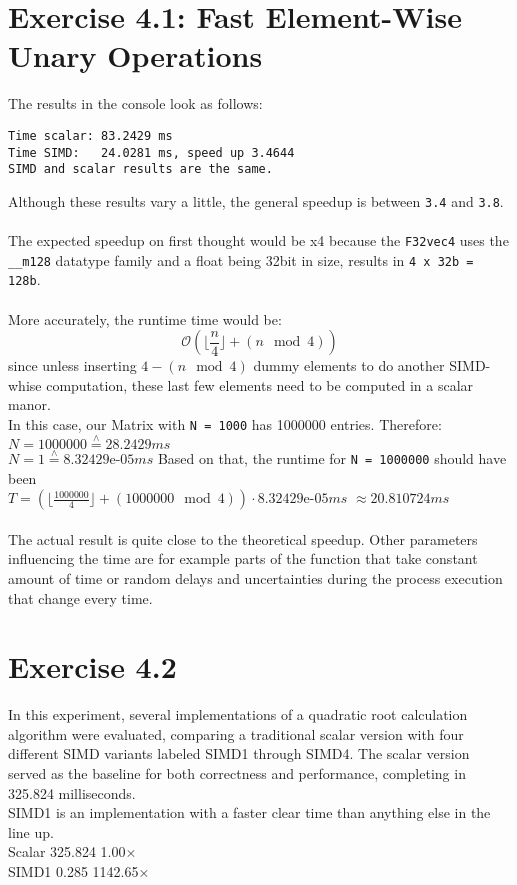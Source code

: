 \documentclass[a4paper]{article}
\begin{document}
\section*{Exercise 4.1: Fast Element-Wise Unary Operations}
The results in the console look as follows:
\begin{lstlisting}[caption={"Output of Matrix.cpp"}]
Time scalar: 83.2429 ms 
Time SIMD:   24.0281 ms, speed up 3.4644
SIMD and scalar results are the same.
\end{lstlisting}
Although these results vary a little, the general speedup is between \texttt{3.4} and \texttt{3.8}.\\\\
The expected speedup on first thought would be x4 because the \texttt{F32vec4} uses the \texttt{\_\_m128} datatype family and a float being 32bit in size, results in \texttt{4 x 32b = 128b}.\\\\
More accurately, the runtime time would be: \[\mathcal{O}\left(\lfloor\frac{n}{4}\rfloor + (n \mod 4)\right)\] since unless inserting $4 - (n \mod 4)$ dummy elements to do another SIMD-whise computation, these last few elements need to be computed in a scalar manor.\\
In this case, our Matrix with \texttt{N = 1000} has 1000000 entries. Therefore:\\
\(
N = 1000000 \overset{\wedge}{=} 28.2429ms
\)\\
\(
N = 1 \overset{\wedge}{=} \text{8.32429e-05}ms
\)
Based on that, the runtime for \texttt{N = 1000000} should have been\\
$T = \left(\lfloor\frac{1000000}{4}\rfloor + (1000000 \mod 4)\right) \cdot \text{8.32429e-05}ms$
$\approx 20.810724ms$\\\\
The actual result is quite close to the theoretical speedup. Other parameters influencing the time are for example parts of the function that take constant amount of time or random delays and uncertainties during the process execution that change every time.

\section*{Exercise 4.2}
In this experiment, several implementations of a quadratic root calculation algorithm were evaluated, comparing a traditional scalar version with four different SIMD variants labeled SIMD1 through SIMD4. The scalar version served as the baseline for both correctness and performance, completing in 325.824 milliseconds.\\
SIMD1 is an implementation with a faster clear time than anything else in the line up.\\
Scalar	325.824	1.00×\\
SIMD1	0.285	1142.65×\\
\\
\end{document}
